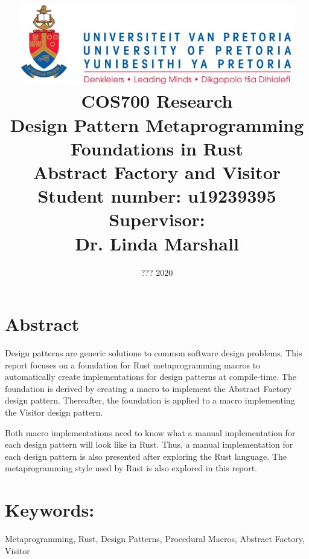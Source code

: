 \documentclass[a4paper,10pt]{article}
\title
{
   \includegraphics[width=12cm]{up_logo.png} \\
   \vspace{2cm}
   \textbf{COS700 Research} \\ \vspace{0.5cm}
   \textbf{Design Pattern Metaprogramming Foundations in Rust\\ \large Abstract Factory and Visitor} \\ \vspace{0.5cm}
   \textbf{Student number:} u19239395 \\ \vspace{0.5cm}
   \textbf{Supervisor}: \\ Dr. Linda Marshall
}
\date{??? 2020}
\begin{document}
\author{}

\maketitle

\newpage
\linespread{1.25}

\section*{Abstract}
Design patterns are generic solutions to common software design problems.
This report focuses on a foundation for Rust metaprogramming macros to automatically create implementations for design patterns at compile-time.
The foundation is derived by creating a macro to implement the Abstract Factory design pattern.
Thereafter, the foundation is applied to a macro implementing the Visitor design pattern.

Both macro implementations need to know what a manual implementation for each design pattern will look like in Rust.
Thus, a manual implementation for each design pattern is also presented after exploring the Rust language.
The metaprogramming style used by Rust is also explored in this report.

\section*{Keywords:}
Metaprogramming,
Rust,
Design Patterns,
Procedural Macros,
Abstract Factory,
Visitor

\newpage


% 
% 
% 
% 




\end{document}
